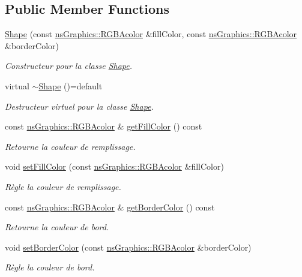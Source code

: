 \subsection*{Public Member Functions}
\begin{DoxyCompactItemize}
\item 
\hyperlink{classns_shape_1_1_shape_a879f450649c23c83dee576234703951d}{Shape} (const \hyperlink{classns_graphics_1_1_r_g_b_acolor}{ns\+Graphics\+::\+R\+G\+B\+Acolor} \&fill\+Color, const \hyperlink{classns_graphics_1_1_r_g_b_acolor}{ns\+Graphics\+::\+R\+G\+B\+Acolor} \&border\+Color)
\begin{DoxyCompactList}\small\item\em Constructeur pour la classe \hyperlink{classns_shape_1_1_shape}{Shape}. \end{DoxyCompactList}\item 
virtual \hyperlink{classns_shape_1_1_shape_aaa22752af0d45c4e219e3870baf899d4}{$\sim$\+Shape} ()=default
\begin{DoxyCompactList}\small\item\em Destructeur virtuel pour la classe \hyperlink{classns_shape_1_1_shape}{Shape}. \end{DoxyCompactList}\item 
const \hyperlink{classns_graphics_1_1_r_g_b_acolor}{ns\+Graphics\+::\+R\+G\+B\+Acolor} \& \hyperlink{classns_shape_1_1_shape_a8efbd1ac47497b188edeb019557ef754}{get\+Fill\+Color} () const
\begin{DoxyCompactList}\small\item\em Retourne la couleur de remplissage. \end{DoxyCompactList}\item 
void \hyperlink{classns_shape_1_1_shape_aa0e9b22c076b83c4d5014b0213e5ce07}{set\+Fill\+Color} (const \hyperlink{classns_graphics_1_1_r_g_b_acolor}{ns\+Graphics\+::\+R\+G\+B\+Acolor} \&fill\+Color)
\begin{DoxyCompactList}\small\item\em Règle la couleur de remplissage. \end{DoxyCompactList}\item 
const \hyperlink{classns_graphics_1_1_r_g_b_acolor}{ns\+Graphics\+::\+R\+G\+B\+Acolor} \& \hyperlink{classns_shape_1_1_shape_aca75f4b06e8e5b04d0271d191210299d}{get\+Border\+Color} () const
\begin{DoxyCompactList}\small\item\em Retourne la couleur de bord. \end{DoxyCompactList}\item 
void \hyperlink{classns_shape_1_1_shape_a48821100aa1856f188bdba257505adc3}{set\+Border\+Color} (const \hyperlink{classns_graphics_1_1_r_g_b_acolor}{ns\+Graphics\+::\+R\+G\+B\+Acolor} \&border\+Color)
\begin{DoxyCompactList}\small\item\em Règle la couleur de bord. \end{DoxyCompactList}\end{DoxyCompactItemize}
